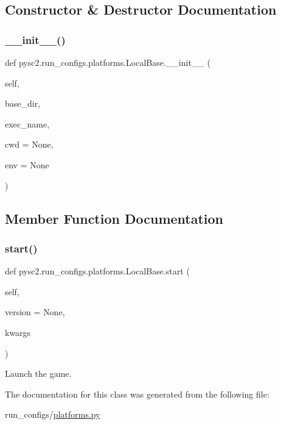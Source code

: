 \subsection{Constructor \& Destructor Documentation}
\mbox{\label{classpysc2_1_1run__configs_1_1platforms_1_1_local_base_a9d70a5d03b43c39b76e413173bfb23c7}} 
\subsubsection{\texorpdfstring{\+\_\+\+\_\+init\+\_\+\+\_\+()}{\_\_init\_\_()}}
{\footnotesize\ttfamily def pysc2.\+run\+\_\+configs.\+platforms.\+Local\+Base.\+\_\+\+\_\+init\+\_\+\+\_\+ (\begin{DoxyParamCaption}\item[{}]{self,  }\item[{}]{base\+\_\+dir,  }\item[{}]{exec\+\_\+name,  }\item[{}]{cwd = {\ttfamily None},  }\item[{}]{env = {\ttfamily None} }\end{DoxyParamCaption})}



\subsection{Member Function Documentation}
\mbox{\label{classpysc2_1_1run__configs_1_1platforms_1_1_local_base_a496abff1cd714158ea53bcbd05d7a4a3}} 
\subsubsection{\texorpdfstring{start()}{start()}}
{\footnotesize\ttfamily def pysc2.\+run\+\_\+configs.\+platforms.\+Local\+Base.\+start (\begin{DoxyParamCaption}\item[{}]{self,  }\item[{}]{version = {\ttfamily None},  }\item[{}]{kwargs }\end{DoxyParamCaption})}

\begin{DoxyVerb}Launch the game.\end{DoxyVerb}
 

The documentation for this class was generated from the following file\+:\begin{DoxyCompactItemize}
\item 
run\+\_\+configs/\mbox{\hyperlink{platforms_8py}{platforms.\+py}}\end{DoxyCompactItemize}
